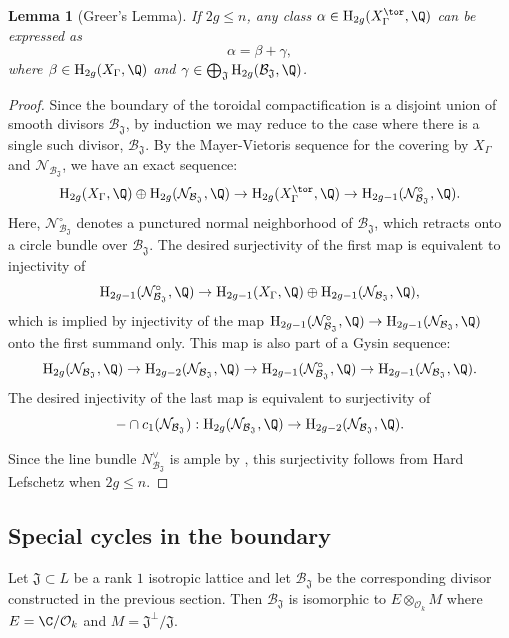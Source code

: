 \documentclass[11pt,letterpaper,english]{amsart}
\numberwithin{equation}{subsection}
\numberwithin{equation}{section}
\newcommand\cB{{\mathcal B}}
\newcommand\cO{{\mathcal O}}
\newcommand\fJ{{\mathfrak J}}
\theoremstyle{plain}
\newtheorem{lemma}[theorem]{Lemma}
\theoremstyle{remark}
\begin{document}
\begin{lemma}[Greer's Lemma]\label{greer-lemma}
    If $2g \leq n$, any class $\alpha \in \mathrm{H}_{2g}(X_\Gamma^\tor,\Q)$ can be expressed as
    $$\alpha = \beta + \gamma,$$
    where $\beta \in \mathrm{H}_{2g}(X_\Gamma,\Q)$ and $\gamma \in \bigoplus_{\fJ} \mathrm{H}_{2g}(\cB_{\mathfrak J},\Q)$.
\end{lemma}
\begin{proof}
Since the boundary of the toroidal compactification is a disjoint union of smooth divisors $\cB_{\mathfrak{J}}$, by induction we may reduce to the case where there is a single such divisor, $\cB_{\mathfrak J}$. By the Mayer-Vietoris sequence for the covering by $X_\Gamma$ and $\mathcal N_{\cB_{\mathfrak J}}$, we have an exact sequence:
$$\mathrm{H}_{2g}(X_\Gamma,\Q) \oplus \mathrm{H}_{2g}(\mathcal N_{\cB_{\mathfrak J}},\Q) \to \mathrm{H}_{2g}(X_\Gamma^\tor,\Q) \to \mathrm{H}_{2g-1}(\mathcal N^\circ_{\cB_{\mathfrak J}},\Q).$$
Here, $\mathcal N_{\cB_{\mathfrak J}}^\circ$ denotes a punctured normal neighborhood of $\cB_{\mathfrak J}$, which retracts onto a circle bundle over $\cB_{\mathfrak J}$. The desired surjectivity of the first map is equivalent to injectivity of 
$$\mathrm{H}_{2g-1}(\mathcal N^\circ_{\cB_{\mathfrak J}},\Q) \to \mathrm{H}_{2g-1}(X_\Gamma,\Q) \oplus \mathrm{H}_{2g-1}(\mathcal N_{\cB_{\mathfrak J}},\Q),$$
which is implied by injectivity of the map $\mathrm{H}_{2g-1}(\mathcal N^\circ_{\cB_{\mathfrak J}},\Q) \to \mathrm{H}_{2g-1}(\mathcal N_{\cB_{\mathfrak J}},\Q)$ onto the first summand only. This map is also part of a Gysin sequence:
$$\mathrm{H}_{2g}(\mathcal N_{\cB_{\mathfrak J}},\Q) \to  \mathrm{H}_{2g-2}(\mathcal N_{\cB_{\mathfrak J}},\Q) \to \mathrm{H}_{2g-1}(\mathcal N^\circ_{\cB_\fJ},\Q) \to \mathrm{H}_{2g-1}(\mathcal N_{\cB_{\mathfrak J}},\Q). $$
The desired injectivity of the last map is equivalent to surjectivity of 
$$-\cap c_1(\mathcal N_{\cB_{\mathfrak J}}): \mathrm{H}_{2g}(\mathcal N_{\cB_{\mathfrak J}},\Q) \to  \mathrm{H}_{2g-2}(\mathcal N_{\cB_{\mathfrak J}},\Q).$$

Since the line bundle $N^\vee_{{\cB_{\mathfrak J}}}$ is ample by , this surjectivity follows from Hard Lefschetz when $2g\leq n$.

\end{proof}

\subsection{Special cycles in the boundary}\label{subs:cycles-boundary}
Let $\mathfrak J\subset L$ be a rank $1$ isotropic lattice and let $\cB_{\mathfrak J}$ be the corresponding divisor constructed in the previous section. Then $\cB_{\mathfrak J}$ is isomorphic to $E\otimes_{\cO_k} M$ where $E=\C/\mathcal{O}_k$ and $M=\mathfrak{J}^\bot/\mathfrak{J}$. 
\end{document}
